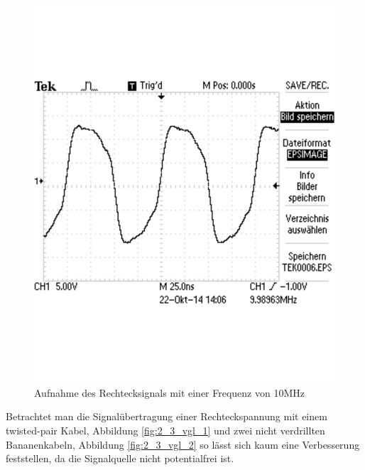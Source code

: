 \documentclass[12pt,a4paper]{article}
\begin{document}
\begin{figure}[H] 
  \centering
    \includegraphics[scale = 0.4]{2_2_rech_10mhz.pdf}
  	\caption[Aufnahme des Rechtecksignals mit einer Frequenz von 10MHz]{Aufnahme des Rechtecksignals mit einer Frequenz von 10MHz}
  \label{fig:2_2_rech_10mhz}
\end{figure}

Betrachtet man die Signalübertragung einer Rechteckspannung mit einem twisted-pair Kabel, Abbildung \ref{fig:2_3_vgl_1} und zwei nicht verdrillten Bananenkabeln, Abbildung \ref{fig:2_3_vgl_2} so lässt sich kaum eine Verbesserung feststellen, da die Signalquelle nicht potentialfrei ist.
\end{document}
